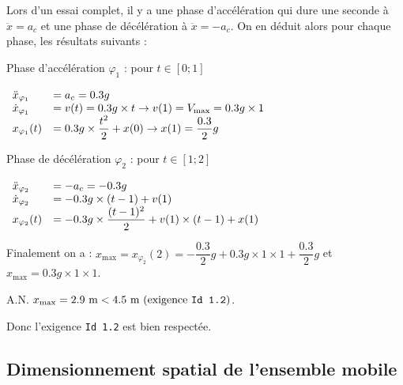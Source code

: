 \ifprof
\begin{corrige}
Lors d'un essai complet, il y a une phase d'accélération qui dure une seconde à $\ddot x = a_c$ et une phase de décélération à $\ddot x = - a_c$. On en déduit alors pour chaque phase, les résultats suivants :\\

\begin{minipage}{.5\textwidth}
	\begin{center}Phase d'accélération $\varphi_1$ : pour $t \in [0;1]$\end{center}
$
\begin{array}{l l}
\ddot x_{\varphi_1} & = a_c = 0.3 g\\
\dot x_{\varphi_1} & = v(t) = 0.3 g \times t \rightarrow v(1) = V_\text{max} = 0.3 g \times 1 \\
x_{\varphi_1}(t) & =  0.3 g \times \dfrac{t^2}{2} + x(0) \rightarrow x(1) = \dfrac{0.3}{2} g
\end{array}
$
\end{minipage}
\begin{minipage}{.5\textwidth}
	\begin{center}Phase de décélération $\varphi_2$  : pour $t \in [1;2]$\end{center}
$
\begin{array}{l l}
\ddot x_{\varphi_2} & = -a_c = -0.3 g\\
\dot x_{\varphi_2} & = -0.3 g \times (t-1) + v(1)\\
x_{\varphi_2}(t) & = -0.3 g \times \dfrac{(t-1)^2}{2} + v(1) \times (t-1) + x(1)
\end{array}
$
\end{minipage}

\vspace{1em}
Finalement on a : $x_\text{max} = x_{\varphi_2}(2) = -\dfrac{0.3}{2} g + 0.3 g \times 1 \times 1 + \dfrac{0.3}{2} g$ et $ x_\text{max} = 0.3 g \times 1 \times 1 $.

A.N. $ x_\text{max} = 2.9 \text{ m} < 4.5 \text{ m} \text{  (exigence \texttt{Id 1.2})}$.

Donc l'exigence \texttt{Id 1.2} est bien respectée.
\end{corrige}
\else
\fi

\subsection{Dimensionnement spatial de l'ensemble mobile \label{ccs_mp_2022_sec_2B}}

